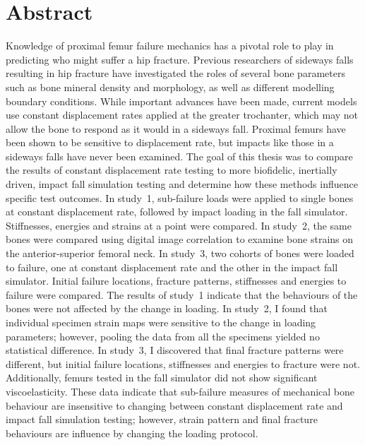 \chapter{Abstract}
\label{ch:abstract}
Knowledge of proximal femur failure mechanics has a pivotal role to play in predicting who might suffer a hip fracture.
Previous researchers of sideways falls resulting in hip fracture have investigated the roles of several bone parameters such as bone mineral density and morphology, as well as different modelling boundary conditions.
While important advances have been made, current models use constant displacement rates applied at the greater trochanter, which may not allow the bone to respond as it would in a sideways fall.
Proximal femurs have been shown to be sensitive to displacement rate, but impacts like those in a sideways falls have never been examined.
The goal of this thesis was to compare the results of constant displacement rate testing to more biofidelic, inertially driven, impact fall simulation testing and determine how these methods influence specific test outcomes.
In study~1, sub-failure loads were applied to single bones at constant displacement rate, followed by impact loading in the fall simulator.
Stiffnesses, energies and strains at a point were compared.
In study~2, the same bones were compared using digital image correlation to examine bone strains on the anterior-superior femoral neck.
In study~3, two cohorts of bones were loaded to failure, one at constant displacement rate and the other in the impact fall simulator.
Initial failure locations, fracture patterns, stiffnesses and energies to failure were compared.
The results of study~1 indicate that the behaviours of the bones were not affected by the change in loading.
In study~2, I found that individual specimen strain maps were sensitive to the change in loading parameters; however, pooling the data from all the specimens yielded no statistical difference.
In study~3, I discovered that final fracture patterns were different, but initial failure locations, stiffnesses and energies to fracture were not.
Additionally, femurs tested in the fall simulator did not show significant viscoelasticity.
These data indicate that sub-failure measures of mechanical bone behaviour are insensitive to changing between constant displacement rate and impact fall simulation testing; however, strain pattern and final fracture behaviours are influence by changing the loading protocol.